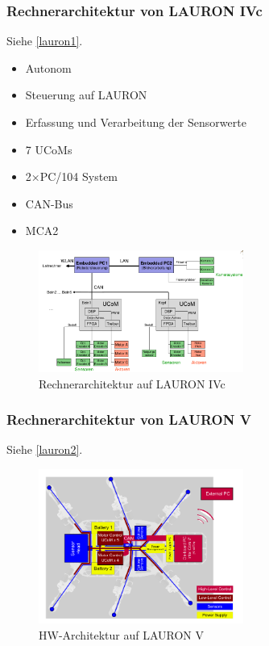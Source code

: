 \subsubsection{Rechnerarchitektur von LAURON IVc}
Siehe \autoref{lauron1}.
\begin{itemize}
\item Autonom
\item Steuerung auf LAURON
\item Erfassung und Verarbeitung der Sensorwerte
\item 7 UCoMs
\item 2×PC/104 System
\item CAN-Bus
\item MCA2
\end{itemize}  
\begin{figure}[h!]
	\centering
	\includegraphics[width=0.6\textwidth]{figures/ch07_lauron-ivc.png}
	\caption{Rechnerarchitektur auf LAURON IVc}
	\label{lauron1}
\end{figure}
\subsubsection{Rechnerarchitektur von LAURON V}
Siehe \autoref{lauron2}.
\begin{figure}[h!]
	\centering
	\includegraphics[width=0.6\textwidth]{figures/ch07_lauron-v.png}
	\caption{HW-Architektur auf LAURON V}
	\label{lauron2}
\end{figure}
